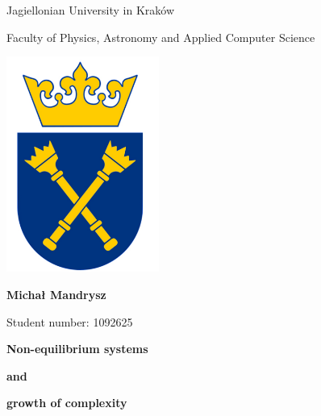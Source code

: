 \documentclass[a4paper,12pt]{article}
\begin{document}
\pagestyle{empty}
  
		
		
		
\vspace{0.2cm}

\begin{center}
\begin{Huge}Jagiellonian University in Kraków
\end{Huge}
\end{center}
\vspace{0.015cm}

\begin{center}
\begin{Large}Faculty of Physics, Astronomy and Applied Computer Science
\end{Large}
\end{center}
\begin{center}\includegraphics[width=5cm,angle=0]{ujlogo.pdf}\end{center} 


\vspace{0.1cm}

\begin{center}
\begin{LARGE}\textbf{Michał Mandrysz}\end{LARGE}
\end{center}
\begin{center}
\begin{Large}Student number: 1092625\end{Large}
\end{center}

\vspace{0.1cm}

\begin{center}
\begin{Huge}\textbf{Non-equilibrium systems}
\vspace{0.1cm}

\textbf{and}

\vspace{0.1cm}

\textbf{growth of complexity}

\end{Huge}
\end{center}
\end{document}
